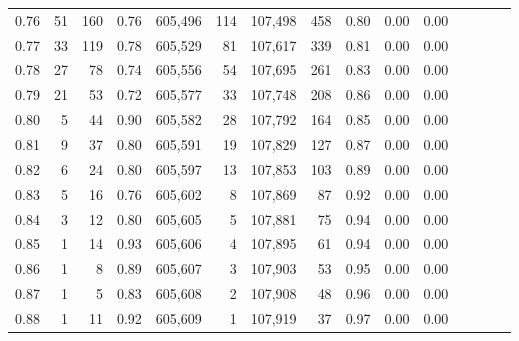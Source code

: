\begin{tabular}{rrrcrrrrrrrrrrr}
0.76 &      51 &    160 &                                       0.76 &  605,496 &      114 &  107,498 &      458 &  0.80 &  0.00 &                         0.00 \\
0.77 &      33 &    119 &                                       0.78 &  605,529 &       81 &  107,617 &      339 &  0.81 &  0.00 &                         0.00 \\
0.78 &      27 &     78 &                                       0.74 &  605,556 &       54 &  107,695 &      261 &  0.83 &  0.00 &                         0.00 \\
0.79 &      21 &     53 &                                       0.72 &  605,577 &       33 &  107,748 &      208 &  0.86 &  0.00 &                         0.00 \\
0.80 &       5 &     44 &                                       0.90 &  605,582 &       28 &  107,792 &      164 &  0.85 &  0.00 &                         0.00 \\
0.81 &       9 &     37 &                                       0.80 &  605,591 &       19 &  107,829 &      127 &  0.87 &  0.00 &                         0.00 \\
0.82 &       6 &     24 &                                       0.80 &  605,597 &       13 &  107,853 &      103 &  0.89 &  0.00 &                         0.00 \\
0.83 &       5 &     16 &                                       0.76 &  605,602 &        8 &  107,869 &       87 &  0.92 &  0.00 &                         0.00 \\
0.84 &       3 &     12 &                                       0.80 &  605,605 &        5 &  107,881 &       75 &  0.94 &  0.00 &                         0.00 \\
0.85 &       1 &     14 &                                       0.93 &  605,606 &        4 &  107,895 &       61 &  0.94 &  0.00 &                         0.00 \\
0.86 &       1 &      8 &                                       0.89 &  605,607 &        3 &  107,903 &       53 &  0.95 &  0.00 &                         0.00 \\
0.87 &       1 &      5 &                                       0.83 &  605,608 &        2 &  107,908 &       48 &  0.96 &  0.00 &                         0.00 \\
0.88 &       1 &     11 &                                       0.92 &  605,609 &        1 &  107,919 &       37 &  0.97 &  0.00 &                         0.00 \\

\end{tabular}
